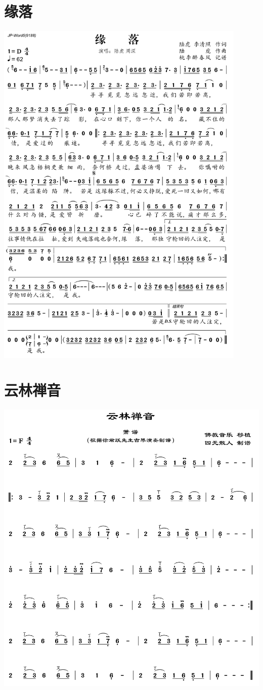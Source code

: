 \documentclass[cn,pad,twocol]{elegantbook}
\begin{document}
\section{缘落}\includegraphics[width=0.9\textwidth]{rpi400/20210124缘落.png}
\section{云林禅音}\includegraphics[width=\textwidth]{rpi400/20210124云林禅音.png}
\end{document}
